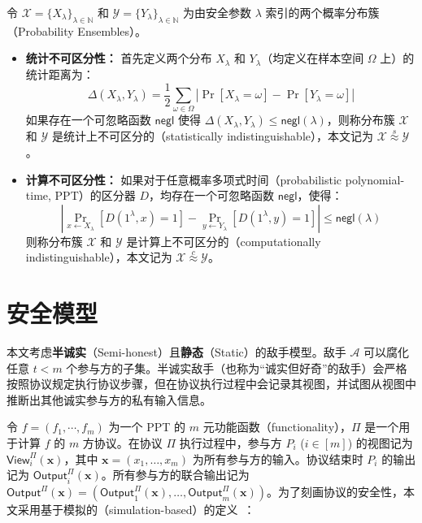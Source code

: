 \begin{definition}[不可区分性]\label{def:indistinguishability}
令 $\mathcal{X} = \{X_\lambda\}_{\lambda \in \mathbb{N}}$ 和 $\mathcal{Y} = \{Y_\lambda\}_{\lambda \in \mathbb{N}}$ 为由安全参数 $\lambda$ 索引的两个概率分布簇（Probability Ensembles）。
\begin{itemize}
    \item \textbf{统计不可区分性：} 首先定义两个分布 $X_\lambda$ 和 $Y_\lambda$（均定义在样本空间 $\Omega$ 上）的统计距离为：
    \begin{equation*}
        \Delta(X_\lambda, Y_\lambda) = \frac{1}{2} \sum_{\omega \in \Omega} |\Pr[X_\lambda = \omega] - \Pr[Y_\lambda = \omega]|
    \end{equation*}
    如果存在一个可忽略函数 $\mathsf{negl}$ 使得 $\Delta(X_\lambda, Y_\lambda) \le \mathsf{negl}(\lambda)$，则称分布簇 $\mathcal{X}$ 和 $\mathcal{Y}$ 是统计上不可区分的（statistically indistinguishable），本文记为 $\mathcal{X} \overset{s}{\approx} \mathcal{Y}$。

    \item \textbf{计算不可区分性：} 如果对于任意概率多项式时间（probabilistic polynomial-time, PPT）的区分器 $D$，均存在一个可忽略函数 $\mathsf{negl}$，使得：
    \begin{equation*}
        \left| \Pr_{x \gets X_\lambda}[D(1^\lambda, x) = 1] - \Pr_{y \gets Y_\lambda}[D(1^\lambda, y) = 1] \right| \le \mathsf{negl}(\lambda)
    \end{equation*}
    则称分布簇 $\mathcal{X}$ 和 $\mathcal{Y}$ 是计算上不可区分的（computationally indistinguishable），本文记为 $\mathcal{X} \overset{c}{\approx} \mathcal{Y}$。
\end{itemize}
\end{definition}

\section{安全模型}

本文考虑\textbf{半诚实}（Semi-honest）且\textbf{静态}（Static）的敌手模型。敌手 $\mathcal{A}$ 可以腐化任意 $t < m$ 个参与方的子集。半诚实敌手（也称为“诚实但好奇”的敌手）会严格按照协议规定执行协议步骤，但在协议执行过程中会记录其视图，并试图从视图中推断出其他诚实参与方的私有输入信息。

令 $f = (f_1, \cdots, f_m)$ 为一个 PPT 的 $m$ 元功能函数（functionality），$\Pi$ 是一个用于计算 $f$ 的 $m$ 方协议。在协议 $\Pi$ 执行过程中，参与方 $P_i$ ($i \in [m]$) 的视图记为 $\mathsf{View}_i^\Pi(\textbf{x})$，其中 $\textbf{x} = (x_1, \dots, x_m)$ 为所有参与方的输入。协议结束时 $P_i$ 的输出记为 $\mathsf{Output}_i^\Pi(\textbf{x})$。所有参与方的联合输出记为 $\mathsf{Output}^\Pi(\textbf{x}) = (\mathsf{Output}_1^\Pi(\textbf{x}), \dots, \mathsf{Output}_m^\Pi(\textbf{x}))$。为了刻画协议的安全性，本文采用基于模拟的（simulation-based）的定义~\cite{Goldreich-FoC2,Canetti01}：

